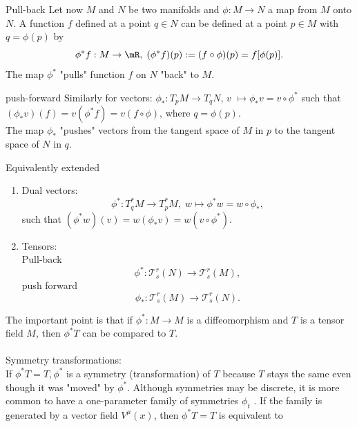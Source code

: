 \begin{mybox}{Pull-back}
	Let now $M$ and $N$ be two manifolds and $\phi: M\rightarrow N$ a map from $M$ onto $N$. A function $f$ defined at a point $q\in N$ can be defined at a point $p\in M$ with $q=\phi(p)$ by 
	\begin{equation}
		\phi^* f : M\rightarrow \mR ,\; (\phi^* f)(p) := (f \circ \phi)(p) = f[\phi(p)].
	\end{equation}
	The map $\phi^*$ "pulls" function $f$ on $N$ "back" to $M$.
\end{mybox}
\begin{mybox}{push-forward}
	Similarly for vectors: $\phi_*:T_pM \rightarrow T_q N$, $v$ $\mapsto \phi_* v=v \circ \phi^*$ such that $(\phi_* v)(f) = v(\phi^* f) = v(f \circ \phi)$, where $q=\phi(p)$.\\
	The map $\phi_*$ "pushes" vectors from the tangent space of $M$ in $p$ to the tangent space of $N$ in $q$.
\end{mybox}
Equivalently extended
\begin{enumerate}
	\item Dual vectors: 
	\begin{equation}
		\phi^*:T^*_q M \rightarrow T^*_p M, \; w \mapsto \phi^* w = w \circ \phi_*,
	\end{equation}
	such that $(\phi^* w)(v) = w(\phi_* v) = w(v \circ \phi^*)$.
	\item Tensors:\\
	 		Pull-back \begin{equation}
	 		 \phi^*: \mathcal{T}^r_s(N) \rightarrow \mathcal{T}^r_s(M),
	 		\end{equation}
	 		push forward
	 		\begin{equation}
	 			\phi_*:\mathcal{T}^r_s(M) \rightarrow \mathcal{T}^r_s(N).
	 		\end{equation}
\end{enumerate}
The important point is that if $\phi^*:M\rightarrow M$ is a diffeomorphism and $T$ is a tensor field $M$, then $\phi^*T$ can be compared to $T$.\\
\\
Symmetry transformations:\\
If $\phi^*T=T, \phi^*$ is a symmetry (transformation) of $T$ because $T$ stays the same even though it was "moved" by $\phi^*$.  Although symmetries may be discrete, it is more common to have a one-parameter family
of symmetries $\phi_t$ . If the family is generated by a vector field $V^μ (x)$, then $\phi^*T=T$ is equivalent to
